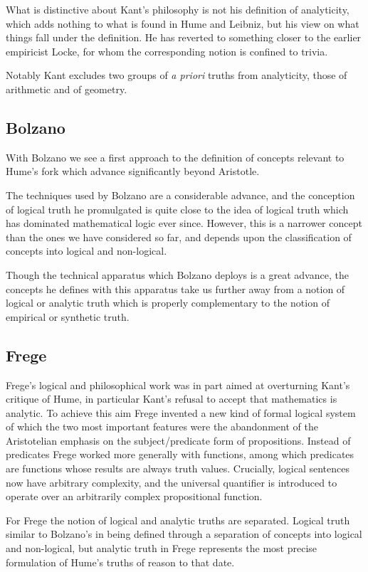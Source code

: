 What is distinctive about Kant's philosophy is not his definition of
analyticity, which adds nothing to what is found in Hume and Leibniz,
but his view on what things fall under the definition.
He has reverted to something closer to the earlier empiricist Locke,
for whom the corresponding notion is confined to trivia.

Notably Kant excludes two groups of \emph{a priori} truths from
analyticity, those of arithmetic and of geometry.

\subsection{Bolzano}

With Bolzano we see a first approach to the definition of concepts
relevant to Hume's fork which advance significantly beyond Aristotle.

The techniques used by Bolzano are a considerable advance, and the
conception of logical truth he promulgated is quite close to the idea
of logical truth which has dominated mathematical logic ever since.
However, this is a narrower concept than the ones we have considered
so far, and depends upon the classification of concepts into logical
and non-logical.

Though the technical apparatus which Bolzano deploys is a great
advance, the concepts he defines with this apparatus take us further
away from a notion of logical or analytic truth which is properly
complementary to the notion of empirical or synthetic truth.

\subsection{Frege}

Frege's logical and philosophical work was in part aimed at
overturning Kant's critique of Hume, in particular Kant's refusal to
accept that mathematics is analytic.
To achieve this aim Frege invented a new kind of formal logical system
of which the two most important features were the abandonment of the
Aristotelian emphasis on the subject/predicate form of propositions.
Instead of predicates Frege worked more generally with functions, among
which predicates are functions whose results are always truth
values.
Crucially, logical sentences now have arbitrary complexity, and the
universal quantifier is introduced to operate over an arbitrarily
complex propositional function.

For Frege the notion of logical and analytic truths are separated.
Logical truth similar to Bolzano's in being defined through a
separation of concepts into logical and non-logical, but analytic
truth in Frege represents the most precise formulation of Hume's
truths of reason to that date.

